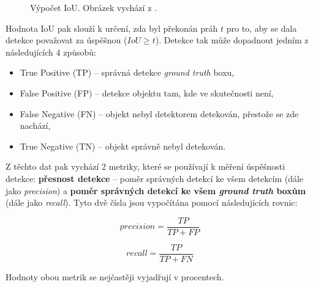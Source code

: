 \begin{figure}[H] 
  \begin{center}
  \label{obrazek:iou}
  \caption{Výpočet IoU. Obrázek vychází z \cite{detekceMetriky}.}
  \end{center}
\end{figure}

Hodnota IoU pak slouží k určení, zda byl překonán práh $t$ pro to, aby se dala detekce považovat za úspěšnou ($IoU \ge t$). Detekce tak může dopadnout jedním z následujících 4 způsobů:

\begin{itemize}
  \item True Positive (TP) -- správná detekce \emph{ground truth} boxu,
  \item False Positive (FP) -- detekce objektu tam, kde ve skutečnosti není,
  \item False Negative (FN) -- objekt nebyl detektorem detekován, přestože se zde nachází,
  \item True Negative (TN) -- objekt správně nebyl detekován.
\end{itemize}

Z těchto dat pak vychází 2 metriky, které se používají k měření úspěšnosti detekce: \textbf{přesnost detekce} -- poměr správných detekcí ke všem detekcím (dále jako \emph{precision}) a \textbf{poměr správných detekcí ke všem \emph{ground truth} boxům} (dále jako \emph{recall}). Tyto dvě čísla jsou vypočítána pomocí následujících rovnic:

\begin{equation}
  precision = \frac{TP}{TP + FP}
\end{equation}

\begin{equation}
  recall = \frac{TP}{TP + FN}
\end{equation}

\noindent Hodnoty obou metrik se nejčastěji vyjadřují v procentech.


